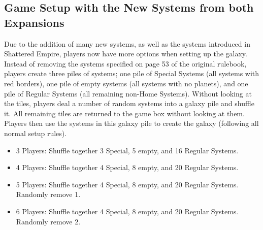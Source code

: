 \documentclass[11pt,fleqn]{book} %
\begin{document}
\begin{STbox}
\subsection{Game Setup with the New Systems from both Expansions}

Due to the addition of many new systems, as well as the systems introduced in Shattered Empire, players now have more options when setting up the galaxy. Instead of removing the systems specified on page 53 of the original rulebook, players create three piles of systems; one pile of Special Systems (all systems with red borders), one pile of empty systems (all systems with no planets), and one pile of Regular Systems (all remaining non-Home Systems). Without looking at the tiles, players deal a number of random systems into a galaxy pile and shuffle it. All remaining tiles are returned to the game box without looking at them. Players then use the systems in this galaxy pile to create the galaxy (following all normal setup rules).

\begin{itemize}
\item 3 Players: Shuffle together 3 Special, 5 empty, and 16 Regular Systems.
\item 4 Players: Shuffle together 4 Special, 8 empty, and 20 Regular Systems.
\item 5 Players: Shuffle together 4 Special, 8 empty, and 20 Regular Systems. Randomly remove 1.
\item 6 Players: Shuffle together 4 Special, 8 empty, and 20 Regular Systems. Randomly remove 2.
\end{itemize}
\end{STbox}

\end{document}
